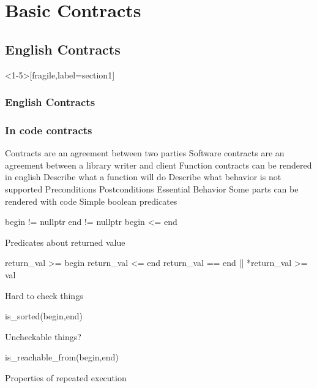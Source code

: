 \section{Basic Contracts}
\begin{frame}
\end{frame}

\subsection{English Contracts}


{
\begin{frame}<1-5>[fragile,label=section1]
  \frametitle<1-8>{English Contracts}
  \frametitle<9-14>{In code contracts}
  \begin{overprint}
     Contracts are an agreement between two parties
     Software contracts are an agreement between a library writer
    and client
     Function contracts can be rendered in english
     Describe what a function will do        %
     Describe what behavior is not supported %
     Preconditions
     Postconditions
     Essential Behavior
     Some parts can be rendered with code
     Simple boolean predicates
      \begin{cppcodebox}
begin != nullptr
end != nullptr
begin <= end
      \end{cppcodebox}      
     Predicates about returned value
    \begin{cppcodebox}
return_val >= begin
return_val <= end
return_val == end || *return_val >= val
    \end{cppcodebox}
     Hard to check things
    \begin{cppcodebox}
is_sorted(begin,end)
    \end{cppcodebox}
     Uncheckable things?
    \begin{cppcodebox}
is_reachable_from(begin,end)
    \end{cppcodebox}
     Properties of repeated execution
    \begin{cppcodebox}

\end{cppcodebox}
\end{overprint}
\end{frame}}
